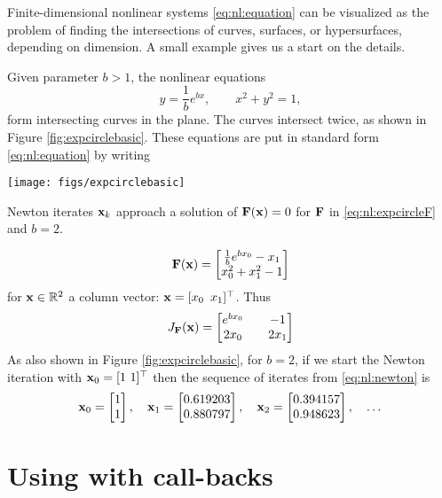 Finite-dimensional nonlinear systems \eqref{eq:nl:equation} can be visualized as the problem of finding the intersections of curves, surfaces, or hypersurfaces, depending on dimension.  A small example gives us a start on the details.

\clearpage
\noindent\hrulefill
\begin{example}  Given parameter $b > 1$, the nonlinear equations
    $$y = \frac{1}{b} e^{bx}, \qquad x^2+y^2 = 1,$$
form intersecting curves in the plane.  The curves intersect twice, as shown in Figure \ref{fig:expcirclebasic}.  These equations are put in standard form \eqref{eq:nl:equation} by writing

\begin{marginfigure}
\texttt{[image: figs/expcirclebasic]}

\medskip
\caption{Newton iterates $\mathbf{x}_k$ approach a solution of $\mathbf{F}(\mathbf{x})=0$ for $\mathbf{F}$ in \eqref{eq:nl:expcircleF} and $b=2$.}
\label{fig:expcirclebasic}
\end{marginfigure}

\begin{equation}
\label{eq:nl:expcircleF}
\mathbf{F}(\mathbf{x}) = \begin{bmatrix}
           \frac{1}{b} e^{b x_0} - x_1 \\
           x_0^2 + x_1^2 - 1
           \end{bmatrix}
\end{equation}
for $\mathbf{x}\in \mathbb{R}^2$ a column vector: $\mathbf{x} = [x_0 \,\,\, x_1]^\top$.  Thus
\begin{equation}
\label{eq:nl:ecjac}
J_{\mathbf{F}}(\mathbf{x}) = \begin{bmatrix}
    e^{b x_0} & & -1 \\
    2 x_0   & & 2 x_1 \end{bmatrix}
\end{equation}
As also shown in Figure \ref{fig:expcirclebasic}, for $b=2$, if we start the Newton iteration with $\mathbf{x}_0 = [1 \,\, 1]^\top$ then the sequence of iterates from \eqref{eq:nl:newton} is
    $${\mathbf{x}}_{0} = \begin{bmatrix} 1 \\ 1 \end{bmatrix}, \quad {\mathbf{x}}_{1} = \begin{bmatrix} 0.619203 \\ 0.880797 \end{bmatrix}, \quad {\mathbf{x}}_{2} = \begin{bmatrix} 0.394157 \\ 0.948623 \end{bmatrix}, \quad \dots$$
\noindent\hrulefill
\end{example}


\section{Using \pSNES with call-backs} \label{sec:usingsnes}

